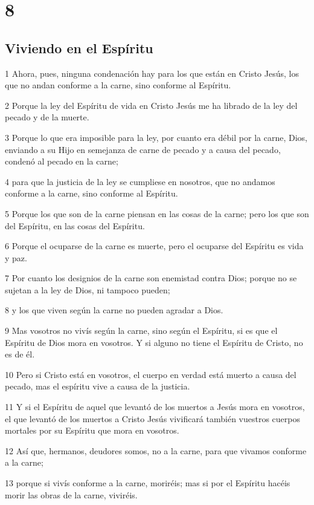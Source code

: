 \chapter{8}

\section*{Viviendo en el Espíritu}

\par 1 Ahora, pues, ninguna condenación hay para los que están en Cristo Jesús, los que no andan conforme a la carne, sino conforme al Espíritu.
\par 2 Porque la ley del Espíritu de vida en Cristo Jesús me ha librado de la ley del pecado y de la muerte.
\par 3 Porque lo que era imposible para la ley, por cuanto era débil por la carne, Dios, enviando a su Hijo en semejanza de carne de pecado y a causa del pecado, condenó al pecado en la carne;
\par 4 para que la justicia de la ley se cumpliese en nosotros, que no andamos conforme a la carne, sino conforme al Espíritu.
\par 5 Porque los que son de la carne piensan en las cosas de la carne; pero los que son del Espíritu, en las cosas del Espíritu.
\par 6 Porque el ocuparse de la carne es muerte, pero el ocuparse del Espíritu es vida y paz.
\par 7 Por cuanto los designios de la carne son enemistad contra Dios; porque no se sujetan a la ley de Dios, ni tampoco pueden;
\par 8 y los que viven según la carne no pueden agradar a Dios.
\par 9 Mas vosotros no vivís según la carne, sino según el Espíritu, si es que el Espíritu de Dios mora en vosotros. Y si alguno no tiene el Espíritu de Cristo, no es de él.
\par 10 Pero si Cristo está en vosotros, el cuerpo en verdad está muerto a causa del pecado, mas el espíritu vive a causa de la justicia.
\par 11 Y si el Espíritu de aquel que levantó de los muertos a Jesús mora en vosotros, el que levantó de los muertos a Cristo Jesús vivificará también vuestros cuerpos mortales por su Espíritu que mora en vosotros.
\par 12 Así que, hermanos, deudores somos, no a la carne, para que vivamos conforme a la carne;
\par 13 porque si vivís conforme a la carne, moriréis; mas si por el Espíritu hacéis morir las obras de la carne, viviréis.
